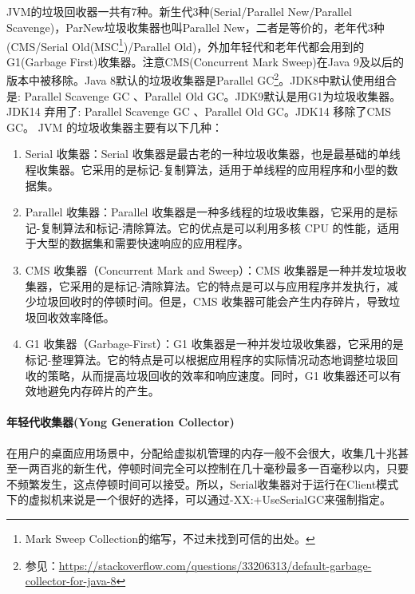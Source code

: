 \documentclass[../../../interview-questions.tex]{subfiles}
\begin{document}
\subsection{\color{red}{JVM的垃圾收集器哪几种}}

JVM的垃圾回收器一共有7种。新生代3种(Serial/Parallel New/Parallel Scavenge)，ParNew垃圾收集器也叫Parallel New，二者是等价的，老年代3种(CMS/Serial Old(MSC\footnote{Mark Sweep Collection的缩写，不过未找到可信的出处。})/Parallel Old)，外加年轻代和老年代都会用到的G1(Garbage First)收集器。注意CMS(Concurrent Mark Sweep)在Java 9及以后的版本中被移除。Java 8默认的垃圾收集器是Parallel GC\footnote{参见：\url{https://stackoverflow.com/questions/33206313/default-garbage-collector-for-java-8}}。JDK8中默认使用组合是: Parallel Scavenge GC 、Parallel Old GC。JDK9默认是用G1为垃圾收集器。JDK14 弃用了: Parallel Scavenge GC 、Parallel Old GC。JDK14 移除了CMS GC。
JVM 的垃圾收集器主要有以下几种：

\begin{enumerate}
    \item {Serial 收集器：Serial 收集器是最古老的一种垃圾收集器，也是最基础的单线程收集器。它采用的是标记-复制算法，适用于单线程的应用程序和小型的数据集。}
    \item {Parallel 收集器：Parallel 收集器是一种多线程的垃圾收集器，它采用的是标记-复制算法和标记-清除算法。它的优点是可以利用多核 CPU 的性能，适用于大型的数据集和需要快速响应的应用程序。}
    \item {CMS 收集器（Concurrent Mark and Sweep）：CMS 收集器是一种并发垃圾收集器，它采用的是标记-清除算法。它的特点是可以与应用程序并发执行，减少垃圾回收时的停顿时间。但是，CMS 收集器可能会产生内存碎片，导致垃圾回收效率降低。}
    \item {G1 收集器（Garbage-First）：G1 收集器是一种并发垃圾收集器，它采用的是标记-整理算法。它的特点是可以根据应用程序的实际情况动态地调整垃圾回收的策略，从而提高垃圾回收的效率和响应速度。同时，G1 收集器还可以有效地避免内存碎片的产生。}
\end{enumerate}


\paragraph{年轻代收集器(Yong Generation Collector)}
在用户的桌面应用场景中，分配给虚拟机管理的内存一般不会很大，收集几十兆甚至一两百兆的新生代，停顿时间完全可以控制在几十毫秒最多一百毫秒以内，只要不频繁发生，这点停顿时间可以接受。所以，Serial收集器对于运行在Client模式下的虚拟机来说是一个很好的选择，可以通过-XX:+UseSerialGC来强制指定。
\end{document}

